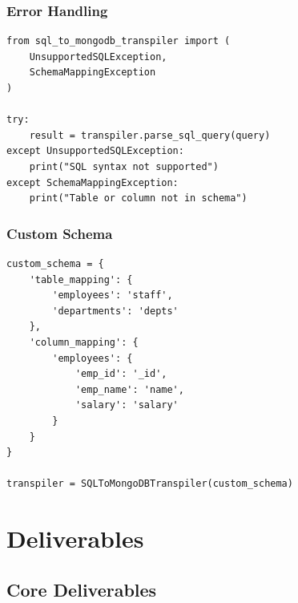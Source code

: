 \documentclass[12pt,a4paper]{article}
\begin{document}
\subsubsection{Error Handling}
\begin{lstlisting}
from sql_to_mongodb_transpiler import (
    UnsupportedSQLException,
    SchemaMappingException
)

try:
    result = transpiler.parse_sql_query(query)
except UnsupportedSQLException:
    print("SQL syntax not supported")
except SchemaMappingException:
    print("Table or column not in schema")
\end{lstlisting}

\subsubsection{Custom Schema}
\begin{lstlisting}
custom_schema = {
    'table_mapping': {
        'employees': 'staff',
        'departments': 'depts'
    },
    'column_mapping': {
        'employees': {
            'emp_id': '_id',
            'emp_name': 'name',
            'salary': 'salary'
        }
    }
}

transpiler = SQLToMongoDBTranspiler(custom_schema)
\end{lstlisting}

\newpage

\section{Deliverables}

\subsection{Core Deliverables}
\end{document}
